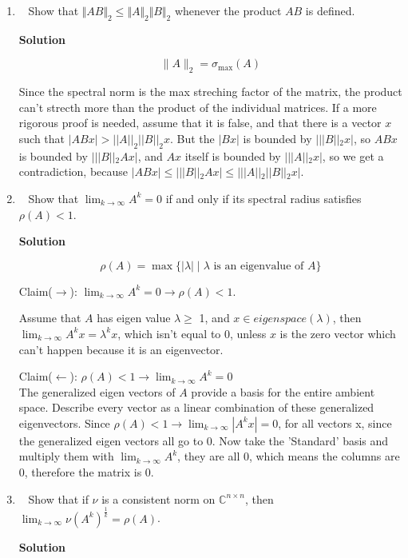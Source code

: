 \documentclass[11pt]{article}
\newcommand\score[1]{\marginpar{\vspace{-2ex}\color{blue}{#1/3}}\hspace{-1ex}}
\newcommand\0{\mathbf{0}}
\newcommand\CC{\mathbb{C}}
\newcommand\<{\langle}
\renewcommand\>{\rangle}
\begin{document}
\begin{enumerate}

\item\ \score{}%
Show that $\Vert AB\Vert_2 \leq \Vert A\Vert_2\Vert B\Vert_2$ whenever
the product $AB$ is defined.

\textbf{Solution}

\[
\| A \|_2 = \sigma_{\max}(A)
\]

Since the spectral norm is the max streching factor of the matrix, the product
can't strecth more than the product of the individual matrices. If a more 
rigorous proof is needed, assume that it is false, and that there is 
a vector $x$ such that $|ABx|> ||A||_{2}||B||_{2}x$. But the $|Bx|$ is bounded by
$|||B||_{2}x|$, so $ABx$ is bounded by $|||B||_{2}Ax|$,  and $Ax$ itself is bounded by 
$|||A||_{2}x|$, so we get a contradiction, because $|ABx| \leq|||B||_{2}Ax| \leq |||A||_{2}||B||_{2}x|$.

\item\ \score{}%
Show that $\lim_{k\to\infty} A^k = 0$ if and only if its spectral
radius satisfies $\rho(A) < 1$.

\textbf{Solution}

\[
\rho(A) = \max \{ |\lambda| \mid \lambda \text{ is an eigenvalue of } A \}
\]

Claim($\rightarrow$): $\lim_{k\to\infty} A^k = 0 \rightarrow \rho(A)<1$.

Assume that $A$ has eigen value $\lambda \geq$ 1, and $x \in eigenspace(\lambda)$, then
$\lim_{k\to \infty}A^{k}x=\lambda^{k}x$, which isn't equal to 0, unless $x$ is the zero vector
which can't happen because it is an eigenvector.

Claim($\leftarrow$): $\rho(A)<1 \rightarrow \lim_{k\to\infty} A^k = 0$\\
The generalized eigen vectors of $A$ provide a basis for the entire ambient space. 
Describe every vector as a linear combination of these generalized eigenvectors. 
Since $\rho(A) < 1 \rightarrow \lim_{k\to\infty} |A^kx| = 0$, for all vectors x, since
the generalized eigen vectors all go to 0. Now take the 'Standard' basis and multiply them with 
$\lim_{k\to\infty}A^k$, they are all 0, which means the columns are 0, therefore the matrix is 0.

\item\ \score{}%
Show that if $\nu$ is a consistent norm on $\CC^{n\times n}$, then
$\lim_{k\to\infty} \nu(A^k)^{\frac 1k} = \rho(A)$.

\textbf{Solution}


\end{enumerate}
\end{document}
